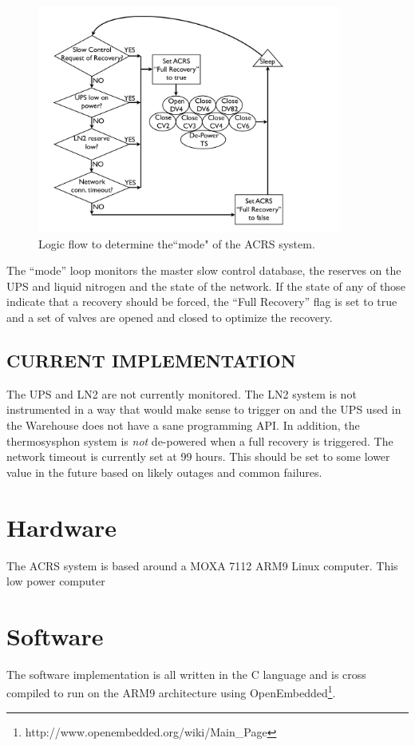 \documentclass[12pt]{article}
\begin{document}
\begin{figure}[ht]
\begin{center}
\includegraphics[width=10cm]{"figs/rec_loop_state_diagram"}
\caption{Logic flow to determine the``mode" of the ACRS system.}
\label{fig:state_loop}
\end{center}
\end{figure}

The ``mode'' loop monitors the master slow control database, the reserves on the UPS and liquid nitrogen and the state of the network.  If the state of any of those indicate that a recovery should be forced, the ``Full Recovery'' flag is set to true and a set of valves are opened and closed to optimize the recovery.  


\subsection{CURRENT IMPLEMENTATION}

The UPS and LN2 are not currently monitored.  The LN2 system is not instrumented in a way that would make sense to trigger on and the UPS used in the Warehouse does not have a sane programming API.  In addition, the thermosysphon system is {\em not} de-powered when a full recovery is triggered.  The network timeout is currently set at 99 hours.  This should be set to some lower value in the future based on likely outages and common failures.  

\section{Hardware}
\label{chap:hw}

The ACRS system is based around a MOXA 7112 ARM9 Linux computer.  This low power computer 

\section{Software}
\label{chap:sw}

The software implementation is all written in the C language and is cross compiled to run on the ARM9 architecture using OpenEmbedded\footnote{http://www.openembedded.org/wiki/Main\_Page}.  
\end{document}

